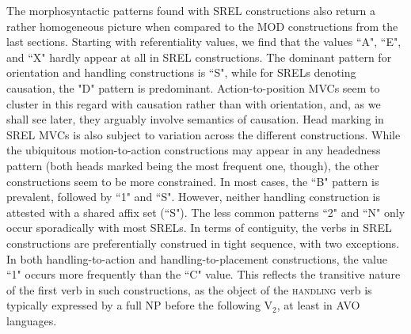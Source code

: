 The morphosyntactic patterns found with SREL constructions also return a rather homogeneous picture when compared to the MOD constructions from the last sections. Starting with referentiality values, we find that the values ``A", ``E", and ``X" hardly appear at all in SREL constructions. The dominant pattern for orientation and handling constructions is ``S", while for SRELs denoting causation, the "D" pattern is predominant. Action-to-position MVCs seem to cluster in this regard with causation rather than with orientation, and, as we shall see later, they arguably involve semantics of causation. Head marking in SREL MVCs is also subject to variation across the different constructions. While the ubiquitous motion-to-action constructions may appear in any headedness pattern (both heads marked being the most frequent one, though), the other constructions seem to be more constrained. In most cases, the ``B" pattern is prevalent, followed by ``1" and ``S". However, neither handling construction is attested with a shared affix set (``S"). The less common patterns ``2" and ``N" only occur sporadically with most SRELs. In terms of contiguity, the verbs in SREL constructions are preferentially construed in tight sequence, with two exceptions. In both handling-to-action and handling-to-placement constructions, the value ``1" occurs more frequently than the ``C" value. This reflects the transitive nature of the first verb in such constructions, as the object of the \textsc{handling} verb is typically expressed by a full NP before the following V$_2$, at least in AVO languages.

